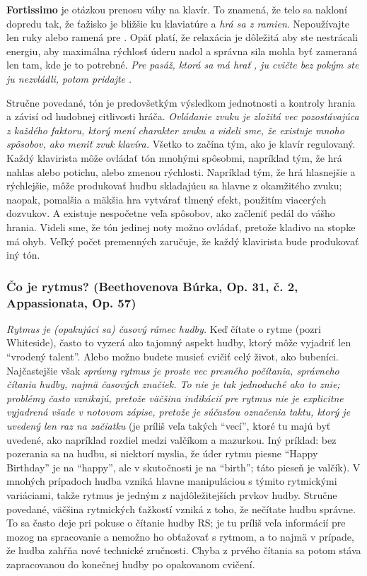 \textbf{Fortissimo} je otázkou prenosu váhy na klavír. To znamená, že telo sa nakloní dopredu tak, že ťažisko je bližšie ku klaviatúre a \emph{hrá sa z ramien}. Nepoužívajte len ruky alebo ramená pre . Opäť platí, že relaxácia je dôležitá aby ste nestrácali energiu, aby maximálna rýchlosť úderu nadol a správna sila mohla byť zameraná len tam, kde je to potrebné. \emph{Pre pasáž, ktorá sa má hrať }\emph{, ju cvičte bez }\emph{ pokým ste ju nezvládli, potom pridajte }\emph{.}

Stručne povedané, tón je predovšetkým výsledkom jednotnosti a kontroly hrania a závisí od hudobnej citlivosti hráča. \emph{Ovládanie zvuku je zložitá vec pozostávajúca z každého faktoru, ktorý mení charakter zvuku a videli sme, že existuje mnoho spôsobov, ako meniť zvuk klavíra.} Všetko to začína tým, ako je klavír regulovaný. Každý klavirista môže ovládať tón mnohými spôsobmi, napríklad tým, že hrá nahlas alebo potichu, alebo zmenou rýchlosti. Napríklad tým, že hrá hlasnejšie a rýchlejšie, môže produkovať hudbu skladajúcu sa hlavne z okamžitého zvuku; naopak, pomalšia a mäkšia hra vytvárať tlmený efekt, použitím viacerých dozvukov. A existuje nespočetne veľa spôsobov, ako začleniť pedál do vášho hrania. Videli sme, že tón jedinej noty možno ovládať, pretože kladivo na stopke má ohyb. Veľký počet premenných zaručuje, že každý klavirista bude produkovať iný tón.

\subsubsection{Čo je rytmus? (Beethovenova Búrka, Op. 31, č. 2, Appassionata, Op. 57)}
\emph{Rytmus je (opakujúci sa) časový rámec hudby.} Keď čítate o rytme (pozri Whiteside), často to vyzerá ako tajomný aspekt hudby, ktorý môže vyjadriť len “vrodený talent”. Alebo možno budete musieť cvičiť celý život, ako bubeníci. Najčastejšie však \emph{správny rytmus je proste vec presného počítania, správneho čítania hudby, najmä časových značiek. To nie je tak jednoduché ako to znie; problémy často vznikajú, pretože väčšina indikácií pre rytmus nie je explicitne vyjadrená všade v notovom zápise, pretože je súčasťou označenia taktu, ktorý je uvedený len raz na začiatku} (je príliš veľa takých “vecí”, ktoré tu majú byť uvedené, ako napríklad rozdiel medzi valčíkom a mazurkou. Iný príklad: bez pozerania sa na hudbu, si niektorí myslia, že úder rytmu piesne “Happy Birthday” je na “happy”, ale v skutočnosti je na “birth”; táto pieseň je valčík). V mnohých prípadoch hudba vzniká hlavne manipuláciou s týmito rytmickými variáciami, takže rytmus je jedným z najdôležitejších prvkov hudby. Stručne povedané, väčšina rytmických ťažkostí vzniká z toho, že nečítate hudbu správne. To sa často deje pri pokuse o čítanie hudby RS; je tu príliš veľa informácií pre mozog na spracovanie a nemožno ho obťažovať s rytmom, a to najmä v prípade, že hudba zahŕňa nové technické zručnosti. Chyba z prvého čítania sa potom stáva zapracovanou do konečnej hudby po opakovanom cvičení.

